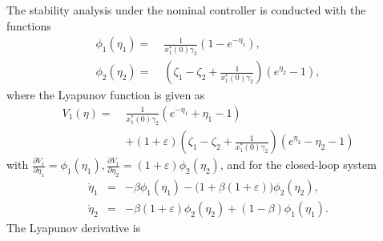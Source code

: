 \documentclass[journal,twoside,web]{ieeecolor}
\begin{document}
The stability analysis under the nominal controller is conducted with the functions
\begin{subequations}
\begin{align}
\phi_1(\eta_1)=\;&\frac{1}{x_1^*(0)\gamma_2}(1-e^{-\eta_1}), \\
\phi_2(\eta_2)=\;&\left(\zeta_1-\zeta_2+\frac{1}{x_1^*(0)\gamma_2}\right)(e^{\eta_2}-1),
\end{align}
\end{subequations}
where the Lyapunov function is given as
\begin{align}
V_1(\eta)
=\;&
\frac{1}{x_1^*(0)\gamma_2}(e^{-\eta_1}+\eta_1-1)
\nonumber \\ &+
(1+\varepsilon)\left(\zeta_1-\zeta_2+\frac{1}{x_1^*(0)\gamma_2}\right)(e^{\eta_2}-\eta_2-1)
\end{align}
with $\frac{\partial V_1}{\partial \eta_1}=\phi_1(\eta_1), \frac{\partial V_1}{\partial \eta_2}=(1+\varepsilon)\phi_2(\eta_2)$, 
and for the closed-loop system
\begin{subequations}
\begin{eqnarray}
\dot\eta_1 &=& -\beta \phi_1(\eta_1)-\bigl(1+\beta(1+\varepsilon)\bigr)\phi_2(\eta_2), \\
\dot\eta_2 &=& -\beta(1+\varepsilon)\phi_2(\eta_2)+(1-\beta)\phi_1(\eta_1).
\end{eqnarray}
\end{subequations}
The Lyapunov derivative is
\end{document}

